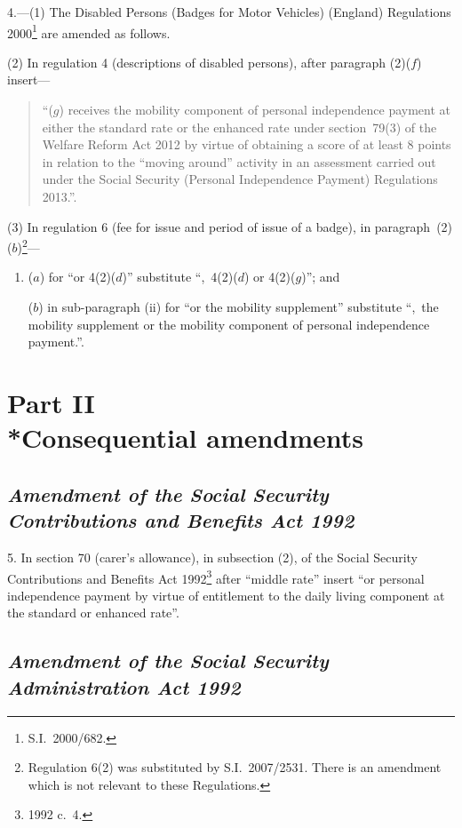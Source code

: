 \documentclass[12pt,a4paper]{article}
\begin{document}
4.—(1) The Disabled Persons (Badges for Motor Vehicles) (England) Regulations 2000\footnote{S.I.~2000/682.} are amended as follows.

(2) In regulation 4 (descriptions of disabled persons), after paragraph (2)($f$)  insert—
\begin{quotation}
“($g$) receives the mobility component of personal independence payment at either the standard rate or the enhanced rate under section~79(3) of the Welfare Reform Act 2012 by virtue of obtaining a score of at least 8 points in relation to the “moving around” activity in an assessment carried out under the Social Security (Personal Independence Payment) Regulations 2013.”.
\end{quotation}

(3) In regulation 6 (fee for issue and period of issue of a badge), in paragraph~(2)($b$)\footnote{Regulation 6(2) was substituted by S.I.~2007/2531. There is an amendment which is not relevant to these Regulations.}—
\begin{enumerate}\item[]
($a$) for “or 4(2)($d$)” substitute “,~4(2)($d$)  or 4(2)($g$)”; and

($b$) in sub-paragraph (ii)  for “or the mobility supplement” substitute “,~the mobility supplement or the mobility component of personal independence payment.”.
\end{enumerate}

\section[Part II --- Consequential amendments]{Part II\\*Consequential amendments}

\renewcommand\parthead{--- Schedule Part II}

\subsection*{\itshape Amendment of the Social Security Contributions and Benefits Act 1992}

5.  In section 70 (carer’s allowance), in subsection (2), of the Social Security Contributions and Benefits Act 1992\footnote{1992 c.~4.} after “middle rate” insert “or personal independence payment by virtue of entitlement to the daily living component at the standard or enhanced rate”.

\subsection*{\itshape Amendment of the Social Security Administration Act 1992}
\end{document}
